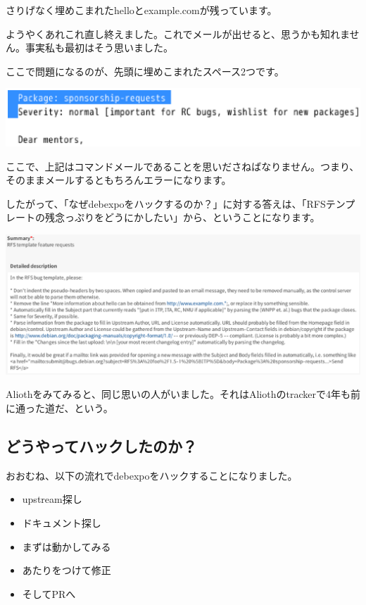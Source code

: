 \documentclass[mingoth,a4paper]{jsarticle}
\begin{document}
さりげなく埋めこまれたhelloとexample.comが残っています。

ようやくあれこれ直し終えました。これでメールが出せると、思うかも知れません。事実私も最初はそう思いました。

ここで問題になるのが、先頭に埋めこまれたスペース2つです。

\begin{screen}
\includegraphics[width=0.5\hsize]{image201606/rfs-template-pithole3.eps}
\end{screen}

ここで、上記はコマンドメールであることを思いださねばなりません。つまり、そのままメールするともちろんエラーになります。

したがって、「なぜdebexpoをハックするのか？」に対する答えは、「RFSテンプレートの残念っぷりをどうにかしたい」から、ということになります。

\begin{screen}
\includegraphics[width=1.0\hsize]{image201606/alioth-debexpo-313593-request.eps}
\end{screen}

Aliothをみてみると、同じ思いの人がいました。それはAliothのtrackerで4年も前に通った道だ、という。

\subsection{どうやってハックしたのか？}

おおむね、以下の流れでdebexpoをハックすることになりました。

\begin{itemize}
  \item upstream探し
  \item ドキュメント探し
  \item まずは動かしてみる
  \item あたりをつけて修正
  \item そしてPRへ
\end{itemize}
\end{document}
